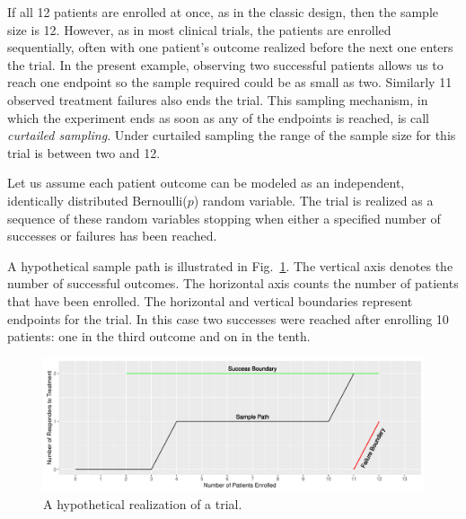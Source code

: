 \documentclass[review]{elsarticle}
\begin{document}
If all 12 patients are enrolled at once, as in the classic
design, then the sample size is 12. However, as in most clinical trials, the
patients are enrolled sequentially, often with one patient's outcome realized
before the next one enters the trial. In the present example, observing two
successful patients allows us to reach one endpoint so the sample required
could be as small as two. Similarly 11
observed treatment failures also ends the trial. This sampling mechanism, in
which the experiment ends as soon as any of the endpoints is reached, is
call {\em curtailed sampling}. Under curtailed sampling the range of the
sample size for this trial is between two and 12.

Let us assume each patient outcome can be modeled as an independent,
identically distributed Bernoulli($p$) random variable. The trial is realized
as a sequence of these random variables stopping when either a
specified number of successes or failures has been reached. 

A hypothetical sample path is illustrated in Fig.~\ref{fig:kane_viz}.
The vertical axis denotes the number of
successful outcomes. The horizontal axis counts the number of patients that
have been enrolled. The horizontal and vertical boundaries represent
endpoints for the trial. In this case two successes were reached after
enrolling 10 patients: one in the third outcome and on in the tenth.

\begin{figure}[t!]
\includegraphics[width=\textwidth]{KanePlot.pdf}
\caption{
A hypothetical realization of a trial.
}
\label{fig:kane_viz}
\end{figure}
\end{document}
